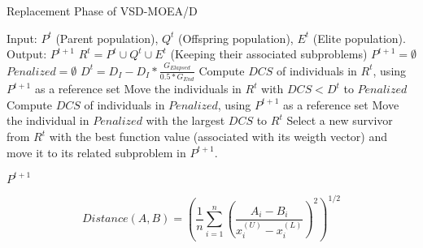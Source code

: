 \begin{algorithm}[t]
        \caption{Replacement Phase of VSD-MOEA/D}
\begin{small}
\begin{algorithmic}[1]
\STATE Input: $P^t$ (Parent population), $Q^t$ (Offspring population), $E^t$ (Elite population).
        \STATE Output: $P^{t+1}$
        \STATE $R^t = P^t \cup Q^t \cup E^t$ (Keeping their associated subproblems) \label{alg:1} 
        \STATE $P^{t+1} = \emptyset$ \label{alg:2}
        \STATE $Penalized = \emptyset$ \label{alg:3}
        \STATE $D^t = D_I - D_I * \frac{G_{Elapsed}}{0.5*G_{End}}$ \label{alg:4}
         \label{alg:6}
            \STATE Compute $DCS$ of individuals in $R^t$, using $P^{t+1}$ as a reference set \label{alg:7}
            \STATE Move the individuals in $R^t$ with $DCS < D^t$ to $Penalized$ \label{alg:8}
                 \label{alg:9}
                    \STATE Compute $DCS$ of individuals in $Penalized$, using $P^{t+1}$ as a reference set \label{alg:10}
                    \STATE Move the individual in $Penalized$ with the largest $DCS$ to $R^t$ \label{alg:11}
                \ENDIF
		\STATE Select a new survivor from $R^t$ with the best function value (associated with its weigth vector) and move it to its related subproblem in $P^{t+1}$.
		\STATE 
	
        \ENDWHILE
        \RETURN $P^{t+1}$ \label{alg:14}
        \end{algorithmic}
\end{small}
\label{alg:replacement}
\end{algorithm}


\begin{equation}\label{eqn:distance}
Distance(A, B) =   \left ( \frac{1}{n}  \sum_{i=1}^n \left ( \frac{A_i - B_i}{x_i^{(U)} - x_i^{(L)}} \right )^2  \right)^{1/2}
\end{equation}


